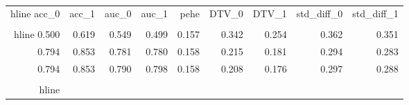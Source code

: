 \begin{table}[h]
\centering
\caption{}
\label{wd_para_2.0_wd_76.40813446044922}
\begin{tabular}{rrrrrrrrr}
\\hline
 acc\_0 &  acc\_1 &  auc\_0 &  auc\_1 &  pehe &  DTV\_0 &  DTV\_1 &  std\_diff\_0 &  std\_diff\_1 \\
\\hline
 0.500 &  0.619 &  0.549 &  0.499 & 0.157 &  0.342 &  0.254 &       0.362 &       0.351 \\
 0.794 &  0.853 &  0.781 &  0.780 & 0.158 &  0.215 &  0.181 &       0.294 &       0.283 \\
 0.794 &  0.853 &  0.790 &  0.798 & 0.158 &  0.208 &  0.176 &       0.297 &       0.288 \\
\\hline
\end{tabular}
\end{table}
